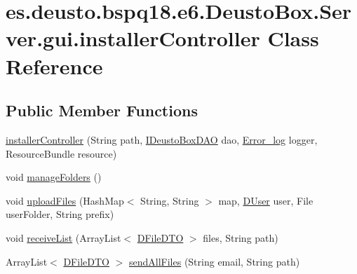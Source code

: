\hypertarget{classes_1_1deusto_1_1bspq18_1_1e6_1_1_deusto_box_1_1_server_1_1gui_1_1installer_controller}{}\section{es.\+deusto.\+bspq18.\+e6.\+Deusto\+Box.\+Server.\+gui.\+installer\+Controller Class Reference}
\label{classes_1_1deusto_1_1bspq18_1_1e6_1_1_deusto_box_1_1_server_1_1gui_1_1installer_controller}
\subsection*{Public Member Functions}
\begin{DoxyCompactItemize}
\item 
\mbox{\hyperlink{classes_1_1deusto_1_1bspq18_1_1e6_1_1_deusto_box_1_1_server_1_1gui_1_1installer_controller_a993deef2db7533bc53a0656cde984b53}{installer\+Controller}} (String path, \mbox{\hyperlink{interfacees_1_1deusto_1_1bspq18_1_1e6_1_1_deusto_box_1_1_server_1_1jdo_1_1dao_1_1_i_deusto_box_d_a_o}{I\+Deusto\+Box\+D\+AO}} dao, \mbox{\hyperlink{classes_1_1deusto_1_1bspq18_1_1e6_1_1_deusto_box_1_1_server_1_1utils_1_1_error__log}{Error\+\_\+log}} logger, Resource\+Bundle resource)
\item 
void \mbox{\hyperlink{classes_1_1deusto_1_1bspq18_1_1e6_1_1_deusto_box_1_1_server_1_1gui_1_1installer_controller_ac8bb835094be4d93b197d7ce4a141640}{manage\+Folders}} ()
\item 
void \mbox{\hyperlink{classes_1_1deusto_1_1bspq18_1_1e6_1_1_deusto_box_1_1_server_1_1gui_1_1installer_controller_a6cb55b3da1b623735e609f2597139659}{upload\+Files}} (Hash\+Map$<$ String, String $>$ map, \mbox{\hyperlink{classes_1_1deusto_1_1bspq18_1_1e6_1_1_deusto_box_1_1_server_1_1jdo_1_1data_1_1_d_user}{D\+User}} user, File user\+Folder, String prefix)
\item 
void \mbox{\hyperlink{classes_1_1deusto_1_1bspq18_1_1e6_1_1_deusto_box_1_1_server_1_1gui_1_1installer_controller_a0b4f20de9ac0e488360307822ee34092}{receive\+List}} (Array\+List$<$ \mbox{\hyperlink{classes_1_1deusto_1_1bspq18_1_1e6_1_1_deusto_box_1_1_server_1_1dto_1_1_d_file_d_t_o}{D\+File\+D\+TO}} $>$ files, String path)
\item 
Array\+List$<$ \mbox{\hyperlink{classes_1_1deusto_1_1bspq18_1_1e6_1_1_deusto_box_1_1_server_1_1dto_1_1_d_file_d_t_o}{D\+File\+D\+TO}} $>$ \mbox{\hyperlink{classes_1_1deusto_1_1bspq18_1_1e6_1_1_deusto_box_1_1_server_1_1gui_1_1installer_controller_afc7cd731e02e09a5fca73d970b91b547}{send\+All\+Files}} (String email, String path)

\end{DoxyCompactItemize}
